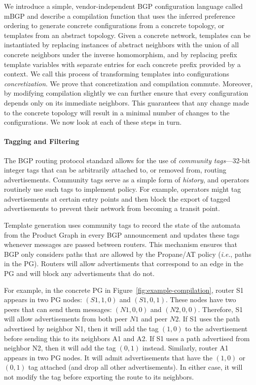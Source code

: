 \documentclass[numbers, 10pt, preprint]{sigplanconf}
\newcommand{\IE}{\emph{i.e.}}
\newcommand{\sysname}{{\text{}\small \sf Propane/AT}\xspace}
\newcommand{\mbgp}{{\small \sf mBGP}\xspace}
\newcommand{\para}[1]{\paragraph*{\textbf{#1}}}
\begin{document}
We introduce a simple, vendor-independent BGP configuration language called \mbgp and describe a compilation function that uses the inferred preference ordering to generate concrete configurations from a concrete topology, or templates from an abstract topology. Given a concrete network, templates can be instantiated by replacing instances of abstract neighbors with the union of all concrete neighbors under the inverse homomorphism, and by replacing prefix template variables with separate entries for each concrete prefix provided by a context. 
 We call this process of transforming templates into configurations \emph{concretization}.  We prove that concretization and compilation commute. Moreover, by modifying compilation slightly we can further ensure that every configuration depends only on its immediate neighbors. This guarantees that any change made to the concrete topology will result in a minimal number of changes to the configurations.
%
We now look at each of these steps in turn.
 

\para{Tagging and Filtering}

The BGP routing protocol standard allows for the use of \emph{community tags}---32-bit integer tags that can be arbitrarily attached to, or removed from, routing advertisements. 
Community tags serve as a simple form of \emph{history}, and operators routinely use such tags to implement policy. For example, operators might tag advertisements at certain entry points and then block the export of tagged 
advertisements to prevent their network from becoming a transit point.

Template generation uses community tags to record the state of the automata from the Product Graph in every BGP announcement and updates these tags whenever messages are passed between routers. This mechanism ensures that BGP only considers paths that are allowed by the \sysname policy (\IE, paths in the PG). Routers will allow advertisments that correspond to an edge in the PG and will block any advertisments that do not.

For example, in the concrete PG in Figure~\ref{fig:example-compilation}, router S1 appears in two PG nodes: $(S1,1,0)$ and $(S1,0,1)$. These nodes have two peers that can send them messages: $(N1,0,0)$ and $(N2,0,0)$. Therefore, S1 will allow advertisements from both peer $N1$ and peer $N2$. If S1 uses the path advertised by neighbor N1, then it will add the tag $(1,0)$ to the advertisement before sending this to its neighbors A1 and A2. If S1 uses a path advertised from neighbor N2, then it will add the tag $(0,1)$ instead. Similarly, router A1 appears in two PG nodes. It will admit advertisements that have the $(1,0)$ or $(0,1)$ tag attached (and drop all other advertisements). In either case, it will not modify the tag before exporting the route to its neighbors.
\end{document}
